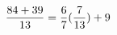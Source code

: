 \documentclass[preview]{standalone}
\begin{document}
\begin{align*}
\special{dvisvgm:raw <g id='unique000'>}\frac{84 + 39}{13} = \frac{6}{7} (\frac{7}{13}) + 9\special{dvisvgm:raw </g>}
\end{align*}
\end{document}
